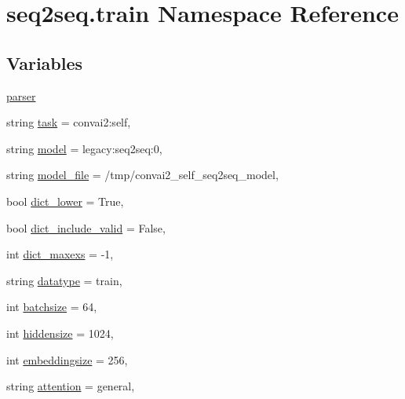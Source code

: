 \hypertarget{namespaceseq2seq_1_1train}{}\section{seq2seq.\+train Namespace Reference}
\label{namespaceseq2seq_1_1train}
\subsection*{Variables}
\begin{DoxyCompactItemize}
\item 
\hyperlink{namespaceseq2seq_1_1train_ae0c077888f9eec1c89d0ac716b9d3c1d}{parser}
\item 
string \hyperlink{namespaceseq2seq_1_1train_a5cedede10b04aba49a6dd9c4cb0e1b49}{task} = \textquotesingle{}convai2\+:self\textquotesingle{},
\item 
string \hyperlink{namespaceseq2seq_1_1train_a1ec78d91ecc9a70a891daef7a504c3b2}{model} = \textquotesingle{}legacy\+:seq2seq\+:0\textquotesingle{},
\item 
string \hyperlink{namespaceseq2seq_1_1train_a5d74abab93fc557cc5139de539cb1970}{model\+\_\+file} = \textquotesingle{}/tmp/convai2\+\_\+self\+\_\+seq2seq\+\_\+model\textquotesingle{},
\item 
bool \hyperlink{namespaceseq2seq_1_1train_a4bec0423a520cd189e9d8261b0642ec3}{dict\+\_\+lower} = True,
\item 
bool \hyperlink{namespaceseq2seq_1_1train_a19397c41047fceb6f49f39623d513e38}{dict\+\_\+include\+\_\+valid} = False,
\item 
int \hyperlink{namespaceseq2seq_1_1train_acd489d39c39baa768dd5e4c7316acfae}{dict\+\_\+maxexs} = -\/1,
\item 
string \hyperlink{namespaceseq2seq_1_1train_a9d1d27146439483fe7b8aeb5cacd2a70}{datatype} = \textquotesingle{}train\textquotesingle{},
\item 
int \hyperlink{namespaceseq2seq_1_1train_ad421e532492d2aa17ccca0e395f57cdc}{batchsize} = 64,
\item 
int \hyperlink{namespaceseq2seq_1_1train_aa53b5dc290c67994aab3ea0e0c45a916}{hiddensize} = 1024,
\item 
int \hyperlink{namespaceseq2seq_1_1train_a99501e666322fecdd98478eaf160e75f}{embeddingsize} = 256,
\item 
string \hyperlink{namespaceseq2seq_1_1train_aa246c0e52c219b2589d7dedd192cb875}{attention} = \textquotesingle{}general\textquotesingle{},
\item 

\end{DoxyCompactItemize}
